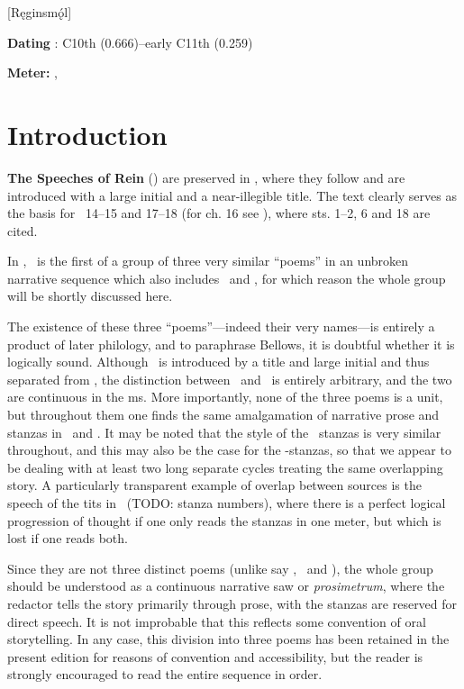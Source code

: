 [Ręginsmǫ́l]
\def\thisBookCode{Reginsmal}

\begin{flushright}%
\textbf{Dating} \parencite{Sapp2022}: C10th (0.666)–early C11th (0.259)

\textbf{Meter:} \Ljodahattr, \Fornyrdislag%
\end{flushright}

\section{Introduction}

\textbf{The Speeches of Rein} (\Reginsmal) are preserved in \Regius, where they follow \Gripisspa and are introduced with a large initial and a near-illegible title.  The text clearly serves as the basis for \VolsungaSaga\ 14–15 and 17–18 (for ch. 16 see \Gripisspa), where sts. 1–2, 6 and 18 are cited.

In \Regius, \Reginsmal\ is the first of a group of three very similar “poems” in an unbroken narrative sequence which also includes \Fafnismal\ and \Sigrdrifumal, for which reason the whole group will be shortly discussed here.

The existence of these three “poems”—indeed their very names—is entirely a product of later philology, and to paraphrase Bellows, it is doubtful whether it is logically sound.  Although \Fafnismal\ is introduced by a title and large initial and thus separated from \Reginsmal, the distinction between \Fafnismal\ and \Sigrdrifumal\ is entirely arbitrary, and the two are continuous in the ms.  More importantly, none of the three poems is a unit, but throughout them one finds the same amalgamation of narrative prose and stanzas in \Fornyrdislag\ and \Ljodahattr.  It may be noted that the style of the \Ljodahattr\ stanzas is very similar throughout, and this may also be the case for the \Fornyrdislag-stanzas, so that we appear to be dealing with at least two long separate cycles treating the same overlapping story.  A particularly transparent example of overlap between sources is the speech of the tits in \Fafnismal\ (TODO: stanza numbers), where there is a perfect logical progression of thought if one only reads the stanzas in one meter, but which is lost if one reads both.

Since they are not three distinct poems (unlike say \Voluspa, \Grimnismal\ and \Vafthrudnismal), the whole group should be understood as a continuous narrative saw or \emph{prosimetrum}, where the redactor tells the story primarily through prose, with the stanzas are reserved for direct speech.  It is not improbable that this reflects some convention of oral storytelling.  In any case, this division into three poems has been retained in the present edition for reasons of convention and accessibility, but the reader is strongly encouraged to read the entire sequence in order.

